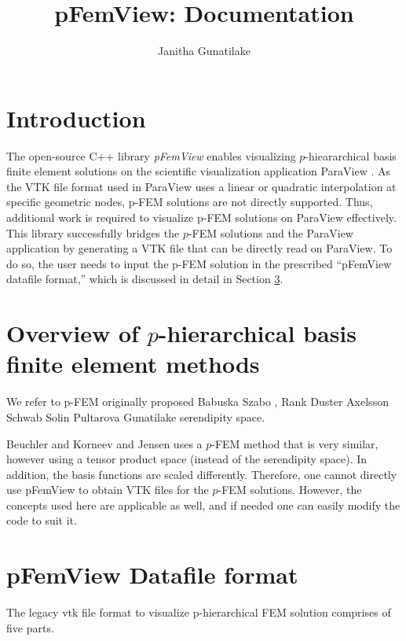 \documentclass[a4paper,12pt]{article}
\title{pFemView: Documentation}
\author{Janitha Gunatilake}
\date{}
\begin{document}
\maketitle

\section{Introduction}
The open-source C++ library \emph{pFemView} enables visualizing $p$-hieararchical basis finite element solutions on the scientific visualization application ParaView \cite{parabook}.
As the VTK file format \cite{vtkBook} used in ParaView uses a linear or quadratic interpolation at specific geometric nodes, p-FEM solutions are not directly supported. Thus, additional work is required to visualize p-FEM solutions on ParaView effectively.
This library successfully bridges the $p$-FEM solutions and the ParaView application by generating a VTK file that can be directly read on ParaView. To do so, the user needs to input the p-FEM solution in the prescribed ``pFemView datafile format,'' which is discussed in detail in Section \ref{sec:pfv}.

\section{Overview of $p$-hierarchical basis finite element methods}

We refer to p-FEM originally proposed Babuska Szabo \cite{sb}, Rank Duster Axelsson Schwab Solin Pultarova
Gunatilake\cite{gunatilake2014, jg2022} serendipity space.

Beuchler and Korneev and Jensen uses a $p$-FEM method that is very similar, however using a tensor product space (instead of the serendipity space). In addition, the basis functions are scaled differently. Therefore, one cannot directly use pFemView to obtain VTK files for the $p$-FEM solutions. However, the concepts used here are applicable as well, and if needed one can easily modify the code to suit it.

\section{pFemView Datafile format}
\label{sec:pfv}
The legacy vtk file format to visualize p-hierarchical FEM solution comprises of five parts. 
\end{document}
